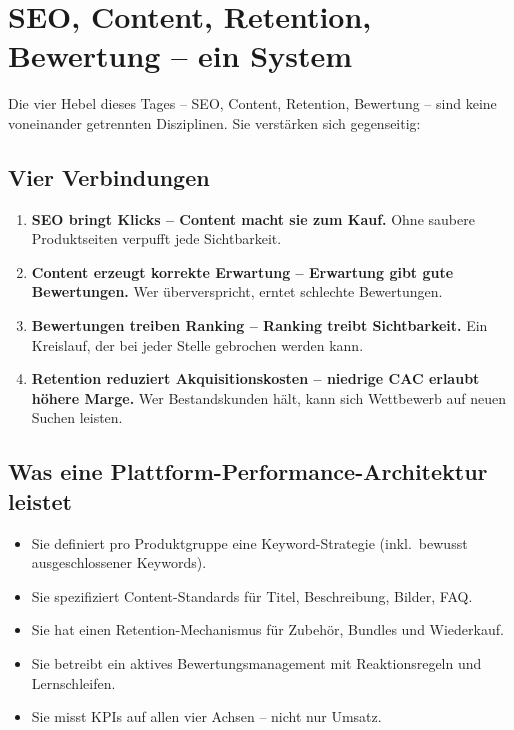 \documentclass[11pt,a4paper,oneside]{article}
\begin{document}
\section{SEO, Content, Retention, Bewertung -- ein System}

Die vier Hebel dieses Tages -- SEO, Content, Retention, Bewertung -- sind keine voneinander getrennten Disziplinen. Sie verstärken sich gegenseitig:

\subsection{Vier Verbindungen}

\begin{enumerate}
  \item \textbf{SEO bringt Klicks -- Content macht sie zum Kauf.} Ohne saubere Produktseiten verpufft jede Sichtbarkeit.
  \item \textbf{Content erzeugt korrekte Erwartung -- Erwartung gibt gute Bewertungen.} Wer überverspricht, erntet schlechte Bewertungen.
  \item \textbf{Bewertungen treiben Ranking -- Ranking treibt Sichtbarkeit.} Ein Kreislauf, der bei jeder Stelle gebrochen werden kann.
  \item \textbf{Retention reduziert Akquisitionskosten -- niedrige CAC erlaubt höhere Marge.} Wer Bestandskunden hält, kann sich Wettbewerb auf neuen Suchen leisten.
\end{enumerate}

\subsection{Was eine Plattform-Performance-Architektur leistet}

\begin{itemize}
  \item Sie definiert pro Produktgruppe eine Keyword-Strategie (inkl.\ bewusst ausgeschlossener Keywords).
  \item Sie spezifiziert Content-Standards für Titel, Beschreibung, Bilder, FAQ.
  \item Sie hat einen Retention-Mechanismus für Zubehör, Bundles und Wiederkauf.
  \item Sie betreibt ein aktives Bewertungsmanagement mit Reaktionsregeln und Lernschleifen.
  \item Sie misst KPIs auf allen vier Achsen -- nicht nur Umsatz.
\end{itemize}
\end{document}
